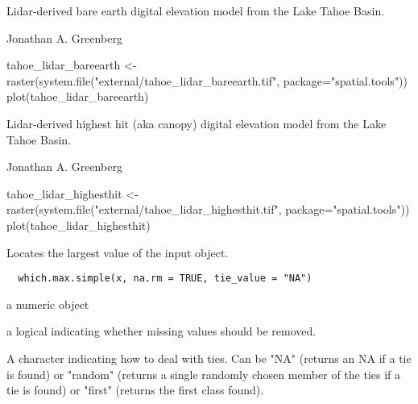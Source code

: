 \documentclass[a4paper]{book}
\begin{document}
%
\begin{Description}\relax
Lidar-derived bare earth digital elevation model from the
Lake Tahoe Basin.
\end{Description}
%
\begin{Author}\relax
Jonathan A. Greenberg 
\end{Author}
%
\begin{Examples}
\begin{ExampleCode}
tahoe_lidar_bareearth <- raster(system.file("external/tahoe_lidar_bareearth.tif", package="spatial.tools"))
plot(tahoe_lidar_bareearth)
\end{ExampleCode}
\end{Examples}
%
\begin{Description}\relax
Lidar-derived highest hit (aka canopy) digital elevation
model from the Lake Tahoe Basin.
\end{Description}
%
\begin{Author}\relax
Jonathan A. Greenberg 
\end{Author}
%
\begin{Examples}
\begin{ExampleCode}
tahoe_lidar_highesthit <- raster(system.file("external/tahoe_lidar_highesthit.tif", package="spatial.tools"))
plot(tahoe_lidar_highesthit)
\end{ExampleCode}
\end{Examples}
%
\begin{Description}\relax
Locates the largest value of the input object.
\end{Description}
%
\begin{Usage}
\begin{verbatim}
  which.max.simple(x, na.rm = TRUE, tie_value = "NA")
\end{verbatim}
\end{Usage}
%
\begin{Arguments}
\begin{ldescription}
\item[\code{x}] a numeric object

\item[\code{na.rm}] a logical indicating whether missing values
should be removed.

\item[\code{tie\_value}] A character indicating how to deal with
ties.  Can be "NA" (returns an NA if a tie is found) or
"random" (returns a single randomly chosen member of the
ties if a tie is found) or "first" (returns the first
class found).
\end{ldescription}
\end{Arguments}
\end{document}
